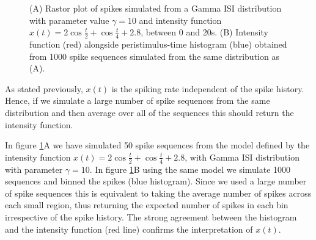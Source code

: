 \documentclass[../main.tex]{subfiles}
\begin{document}
  \begin{figure}[t]
   \hrulefill
   \begin{center} 
     \qquad
    \end{center}     
    \caption{ (A) Rastor plot of spikes simulated from a Gamma ISI distribution with parameter value $\gamma = 10$ and intensity function $x(t) = 2\cos\frac{t}{2} + \cos\frac{t}{4}+2.8$, between 0 and 20s. (B) Intensity function (red) alongside peristimulus-time histogram (blue) obtained from 1000 spike sequences simulated from the same distribution as (A).   }
     \label{fig:rastor}
    \hrulefill
    \end{figure}

%

As stated previously, $x(t)$ is the spiking rate independent of the spike history. Hence, if we simulate a large number of spike sequences from the same distribution and then average over all of the sequences this should return the intensity function.  

In figure \ref{fig:rastor}A we have simulated 50 spike sequences from the model defined by the intensity function $x(t) = 2\cos\frac{t}{2} + \cos\frac{t}{4}+2.8$, with Gamma ISI distribution with parameter $\gamma = 10$. In figure \ref{fig:rastor}B using the same model we simulate 1000 sequences and binned the spikes (blue histogram). Since we used a large number of spike sequences this is equivalent to taking the average number of spikes across each small region, thus returning the expected number of spikes in each bin irrespective of the spike history. The strong agreement between the histogram and the intensity function (red line) confirms the interpretation of $x(t)$.  
\end{document}
